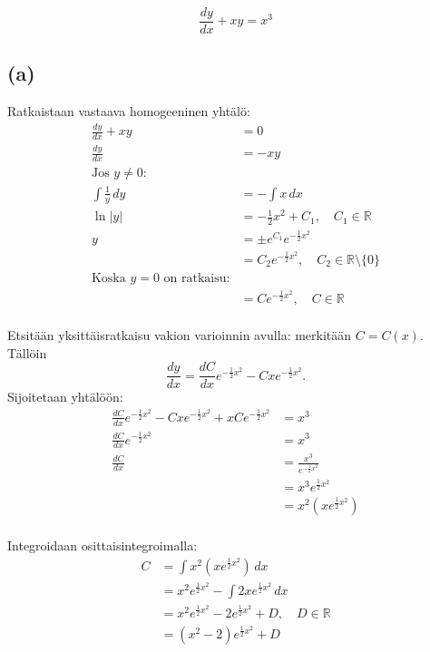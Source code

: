 \documentclass{article}
\begin{document}
\[
  \frac{dy}{dx} + xy = x^3
\]

\subsection*{(a)}

Ratkaistaan vastaava homogeeninen yhtälö:
\begin{align*}
  \frac{dy}{dx} + xy &= 0 \\
  \frac{dy}{dx} &= -xy \\
  \text{Jos $y \neq 0$:} \\
  \int \frac{1}{y} \,dy &= -\int x \,dx \\
  \ln |y| &= -\frac{1}{2}x^2 + C_1, \quad C_1 \in \mathbb{R} \\
  y &= \pm e^{C_1} e^{-\frac{1}{2}x^2} \\
    &= C_2 e^{-\frac{1}{2}x^2}, \quad C_2 \in \mathbb{R} \setminus \{0\} \\
  \text{Koska $y = 0$ on ratkaisu:} \\
    &= Ce^{-\frac{1}{2}x^2}, \quad C \in \mathbb{R} \\
\end{align*}

Etsitään yksittäisratkaisu vakion varioinnin avulla:
merkitään $C = C(x)$. Tällöin
\[
  \frac{dy}{dx} = \frac{dC}{dx}e^{-\frac{1}{2}x^2} - Cxe^{-\frac{1}{2}x^2}.
\]
Sijoitetaan yhtälöön:
\begin{align*}
  \frac{dC}{dx}e^{-\frac{1}{2}x^2} - Cxe^{-\frac{1}{2}x^2} + xCe^{-\frac{1}{2}x^2} &= x^3 \\
  \frac{dC}{dx}e^{-\frac{1}{2}x^2} &= x^3 \\
  \frac{dC}{dx} &= \frac{x^3}{e^{-\frac{1}{2}x^2}} \\
                &= x^3 e^{\frac{1}{2}x^2} \\
                &= x^2(xe^{\frac{1}{2}x^2}) \\
\end{align*}

Integroidaan osittaisintegroimalla:
\begin{align*}
  C &= \int x^2(xe^{\frac{1}{2}x^2}) \,dx \\
    &= x^2e^{\frac{1}{2}x^2} - \int 2xe^{\frac{1}{2}x^2} \,dx \\
    &= x^2e^{\frac{1}{2}x^2} - 2e^{\frac{1}{2}x^2} + D, \quad D \in \mathbb{R} \\
    &= (x^2 - 2)e^{\frac{1}{2}x^2} + D \\
\end{align*}
\end{document}
